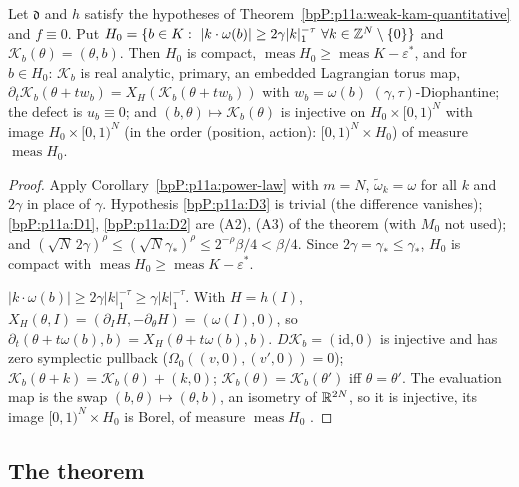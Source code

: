 \begin{lemma}[$f\equiv0$]\label{bpP:p11a:zero-case}
Let $\mathfrak d$ and $h$ satisfy the hypotheses of Theorem~\ref{bpP:p11a:weak-kam-quantitative} and $f\equiv0$. Put $H_0=\{b\in K:\ \lvert k\cdot\omega(b)\rvert\ge2\gamma\lvert k\rvert_1^{-\tau}\ \forall k\in\mathbb{Z}^N\setminus\{0\}\}$ and $\mathcal K_b(\theta)=(\theta,b)$. Then $H_0$ is compact, $\operatorname{meas}H_0\ge\operatorname{meas}K-\varepsilon^*$, and for $b\in H_0$: $\mathcal K_b$ is real analytic, primary, an embedded Lagrangian torus map, $\partial_t\mathcal K_b(\theta+tw_b)=X_H(\mathcal K_b(\theta+tw_b))$ with $w_b=\omega(b)$ $(\gamma,\tau)$-Diophantine; the defect is $u_b\equiv0$; and $(b,\theta)\mapsto\mathcal K_b(\theta)$ is injective on $H_0\times[0,1)^N$ with image $H_0\times[0,1)^N$ (in the order (position, action): $[0,1)^N\times H_0$) of measure $\operatorname{meas}H_0$.
\end{lemma}
\begin{proof}
\label{stepP:p11a:zc-set} Apply Corollary~\ref{bpP:p11a:power-law} with $m=N$, $\tilde\omega_k=\omega$ for all $k$ and $2\gamma$ in place of $\gamma$. Hypothesis \ref{bpP:p11a:D3} is trivial (the difference vanishes); \ref{bpP:p11a:D1}, \ref{bpP:p11a:D2} are (A2), (A3) of the theorem (with $M_0$ not used); and $(\sqrt N\,2\gamma)^\rho\le(\sqrt N\gamma_*)^\rho\le2^{-\rho}\beta/4<\beta/4$. Since $2\gamma=\gamma_*\le\gamma_*$, $H_0$ is compact with $\operatorname{meas}H_0\ge\operatorname{meas}K-\varepsilon^*$.

\label{stepP:p11a:zc-tori} $\lvert k\cdot\omega(b)\rvert\ge2\gamma\lvert k\rvert_1^{-\tau}\ge\gamma\lvert k\rvert_1^{-\tau}$. With $H=h(I)$, $X_H(\theta,I)=(\partial_IH,-\partial_\theta H)=(\omega(I),0)$, so $\partial_t(\theta+t\omega(b),b)=X_H(\theta+t\omega(b),b)$. $D\mathcal K_b=(\mathrm{id},0)$ is injective and has zero symplectic pullback ($\Omega_0((v,0),(v',0))=0$); $\mathcal K_b(\theta+k)=\mathcal K_b(\theta)+(k,0)$; $\mathcal K_b(\theta)=\mathcal K_b(\theta')$ iff $\theta=\theta'$. The evaluation map is the swap $(b,\theta)\mapsto(\theta,b)$, an isometry of $\mathbb{R}^{2N}$, so it is injective, its image $[0,1)^N\times H_0$ is Borel, of measure $\operatorname{meas}H_0$ .
\end{proof}

\subsection{The theorem}\label{bpP:p11a:sec-q-thm}

